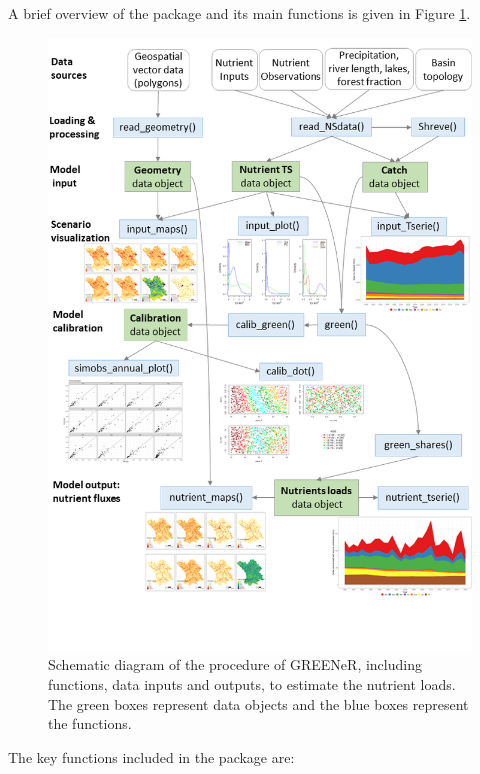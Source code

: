 A brief overview of the package and its main functions is given in Figure \ref{fig:schematic-diagram-GREENeR}.

\begin{figure}[H]
\includegraphics[width=0.9\linewidth,height=0.6\textheight]{figures/fig1} \caption{Schematic diagram of the procedure of GREENeR, including functions, data inputs and outputs, to estimate the nutrient loads. The green boxes represent data objects and the blue boxes represent the functions.}\label{fig:schematic-diagram-GREENeR}
\end{figure}

The key functions included in the package are:

